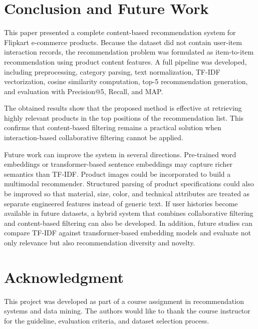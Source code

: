 \documentclass[conference]{IEEEtran}
\begin{document}
\section{Conclusion and Future Work}
This paper presented a complete content-based recommendation system for Flipkart e-commerce products. Because the dataset did not contain user-item interaction records, the recommendation problem was formulated as item-to-item recommendation using product content features. A full pipeline was developed, including preprocessing, category parsing, text normalization, TF-IDF vectorization, cosine similarity computation, top-5 recommendation generation, and evaluation with Precision@5, Recall, and MAP.

The obtained results show that the proposed method is effective at retrieving highly relevant products in the top positions of the recommendation list. This confirms that content-based filtering remains a practical solution when interaction-based collaborative filtering cannot be applied.

Future work can improve the system in several directions. Pre-trained word embeddings or transformer-based sentence embeddings may capture richer semantics than TF-IDF. Product images could be incorporated to build a multimodal recommender. Structured parsing of product specifications could also be improved so that material, size, color, and technical attributes are treated as separate engineered features instead of generic text. If user histories become available in future datasets, a hybrid system that combines collaborative filtering and content-based filtering can also be developed. In addition, future studies can compare TF-IDF against transformer-based embedding models and evaluate not only relevance but also recommendation diversity and novelty.

\section*{Acknowledgment}
This project was developed as part of a course assignment in recommendation systems and data mining. The authors would like to thank the course instructor for the guideline, evaluation criteria, and dataset selection process.
\end{document}
